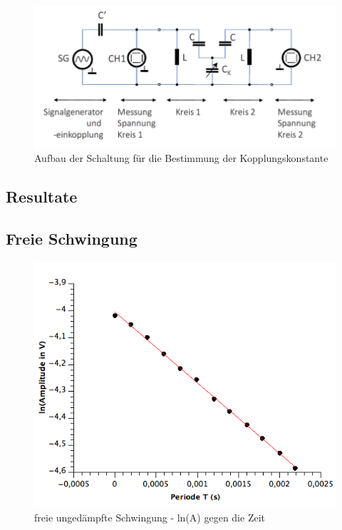 \documentclass[12pt,a4paper]{article}
\begin{document}
\begin{figure}[H]
	\centering
	\includegraphics[scale=1.1]{./figure/kopplung_aufbau.png}
	\caption{Aufbau der Schaltung für die Bestimmung der Kopplungskonstante}
	\label{fig:kopplung_aufbau}
\end{figure}
\begin{multicols}{2}


\pagebreak
\section{Resultate}
\subsection{Freie Schwingung}



\end{multicols}
\begin{figure}[H]
	\centering
	\includegraphics[scale=0.7]{./figure/Schwingkreis_ohne-daempfung.png}
	\caption{freie ungedämpfte Schwingung - ln(A) gegen die Zeit}
	\label{fig:swingkreis_ohnedaempfung}
\end{figure}
\end{document}
